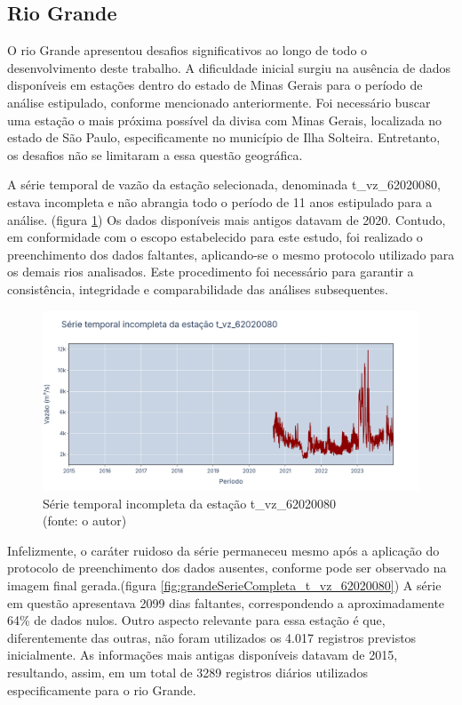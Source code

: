 \clearpage
\subsection{Rio Grande}

O rio Grande apresentou desafios significativos ao longo de todo o desenvolvimento deste trabalho. A dificuldade inicial surgiu na ausência de dados disponíveis em estações dentro do estado de Minas Gerais para o período de análise estipulado, conforme mencionado anteriormente. Foi necessário buscar uma estação o mais próxima possível da divisa com Minas Gerais, localizada no estado de São Paulo, especificamente no município de Ilha Solteira. Entretanto, os desafios não se limitaram a essa questão geográfica.

A série temporal de vazão da estação selecionada, denominada t\_vz\_62020080, estava incompleta e não abrangia todo o período de 11 anos estipulado para a análise. (figura \ref{fig:grandeSerieIncompleta_t_vz_62020080}) Os dados disponíveis mais antigos datavam de 2020. Contudo, em conformidade com o escopo estabelecido para este estudo, foi realizado o preenchimento dos dados faltantes, aplicando-se o mesmo protocolo utilizado para os demais rios analisados. Este procedimento foi necessário para garantir a consistência, integridade e comparabilidade das análises subsequentes.

\begin{figure}[!h]
	\centering
	\includegraphics[scale=0.25]{Figuras/rio_grande/grandeSerieIncompleta_t_vz_62020080.png}
	\caption{Série temporal incompleta da estação t\_vz\_62020080\\(fonte: o autor)}
	\label{fig:grandeSerieIncompleta_t_vz_62020080}
\end{figure}

Infelizmente, o caráter ruidoso da série permaneceu mesmo após a aplicação do protocolo de preenchimento dos dados ausentes, conforme pode ser observado na imagem final gerada.(figura \ref{fig:grandeSerieCompleta_t_vz_62020080}) A série em questão apresentava 2099 dias faltantes, correspondendo a aproximadamente 64\% de dados nulos. Outro aspecto relevante para essa estação é que, diferentemente das outras, não foram utilizados os 4.017 registros previstos inicialmente. As informações mais antigas disponíveis datavam de 2015, resultando, assim, em um total de 3289 registros diários utilizados especificamente para o rio Grande.

